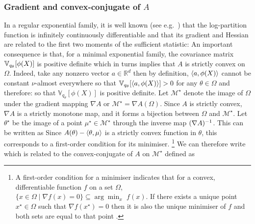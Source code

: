 \subsubsection*{Gradient and convex-conjugate of $A$}
In a regular exponential family, it is well known (see e.g.\ \citet[theorem 2.2]{brown86}) that the log-partition function is infinitely continuously differentiable and that its gradient and Hessian are related to the first two moments of the sufficient statistic:
%
%
An important consequence is that, for a minimal exponential family, the covariance matrix $\mathbb V_{q_\theta}[\phi(X)]$ is positive definite which in turns implies that $A$ is strictly convex on $\Omega$. Indeed, take any nonzero vector $a\in\mathbb R^{d}$ then by definition, $\left\langle a,\phi(X) \right\rangle$ cannot be constant $\nu$-almost everywhere so that $\mathbb V_{q_{\theta}}[\left\langle a,\phi(X) \right\rangle] > 0$ for any $\theta\in\Omega$ and therefore:
so that $\mathbb V_{q_{\theta}}[\phi(X)]$ is positive definite. 
Let $\mathcal M^{\star}$ denote the image of $\Omega$ under the gradient mapping $\nabla A$ or $\mathcal M^{\star}=\nabla A(\Omega)$. Since $A$ is strictly convex, $\nabla A$ is a strictly monotone map, and it forms a bijection between $\Omega$ and $\mathcal M^{\star}$. Let $\theta^{\star}$ be the image of a point $\mu^{\star}\in\mathcal M^{\star}$ through the inverse map $(\nabla A)^{-1}$. 
This can be written as
%
%
Since $A(\theta)-\left\langle \theta,\mu \right\rangle$ is a strictly convex function in $\theta$, this corresponds to a first-order condition for its minimiser.
\footnote{A first-order condition for a minimiser indicates that for a convex, differentiable function $f$ on a set $\Omega$, $\{x\in\Omega\mid \nabla f(x)=0 \}\subseteq\arg\min_{x}\,\,f(x)$. If there exists a unique point $x^{\star}\in\Omega$ such that $\nabla f(x^{\star})=0$ then it is also the unique minimiser of $f$ and both sets are equal to that point \citep[theorem 27.1]{rockafellar70}. } We can therefore write
%
%
which is related to the convex-conjugate of $A$ on $\mathcal M^{\star}$ defined as
